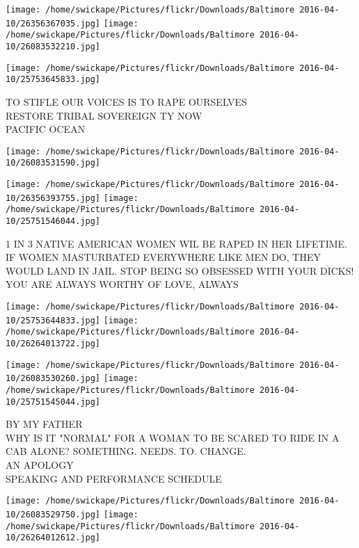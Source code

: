 \documentclass[10pt,letterpaper]{article}
\begin{document}
\texttt{[image: /home/swickape/Pictures/flickr/Downloads/Baltimore 2016-04-10/26356367035.jpg]}
\texttt{[image: /home/swickape/Pictures/flickr/Downloads/Baltimore 2016-04-10/26083532210.jpg]}

\texttt{[image: /home/swickape/Pictures/flickr/Downloads/Baltimore 2016-04-10/25753645833.jpg]}

TO STIFLE OUR VOICES IS TO RAPE OURSELVES\\
RESTORE TRIBAL SOVEREIGN TY NOW\\
PACIFIC OCEAN
\pagebreak

\texttt{[image: /home/swickape/Pictures/flickr/Downloads/Baltimore 2016-04-10/26083531590.jpg]}

\vspace{0.25in}
\texttt{[image: /home/swickape/Pictures/flickr/Downloads/Baltimore 2016-04-10/26356393755.jpg]}
\texttt{[image: /home/swickape/Pictures/flickr/Downloads/Baltimore 2016-04-10/25751546044.jpg]}

1 IN 3 NATIVE AMERICAN WOMEN WIL BE RAPED IN HER LIFETIME.\\
IF WOMEN MASTURBATED EVERYWHERE LIKE MEN DO, THEY WOULD LAND IN JAIL.  STOP BEING SO OBSESSED WITH YOUR DICKS!\\
YOU ARE ALWAYS WORTHY OF LOVE, ALWAYS
\pagebreak

\texttt{[image: /home/swickape/Pictures/flickr/Downloads/Baltimore 2016-04-10/25753644833.jpg]}
\texttt{[image: /home/swickape/Pictures/flickr/Downloads/Baltimore 2016-04-10/26264013722.jpg]}

\texttt{[image: /home/swickape/Pictures/flickr/Downloads/Baltimore 2016-04-10/26083530260.jpg]}
\texttt{[image: /home/swickape/Pictures/flickr/Downloads/Baltimore 2016-04-10/25751545044.jpg]}

BY MY FATHER\\
WHY IS IT "NORMAL" FOR A WOMAN TO BE SCARED TO RIDE IN A CAB ALONE?  SOMETHING.  NEEDS.  TO.  CHANGE.\\
AN APOLOGY\\
SPEAKING AND PERFORMANCE SCHEDULE
\pagebreak

\texttt{[image: /home/swickape/Pictures/flickr/Downloads/Baltimore 2016-04-10/26083529750.jpg]}
\texttt{[image: /home/swickape/Pictures/flickr/Downloads/Baltimore 2016-04-10/26264012612.jpg]}
\end{document}
